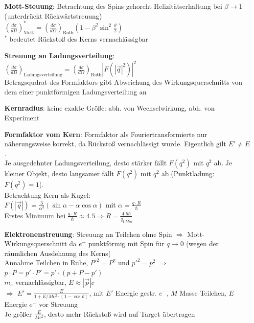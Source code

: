 \documentclass[10pt,twoside,a4paper]{article}
\begin{document}
\begin{multicols*}{3}
\textbf{Mott-Steuung}: Betrachtung des Spins gehorcht Helizitätserhaltung bei $\beta \to 1$ (unterdrückt Rückwärtstreuung) \\
$\left( \frac{d\sigma}{d\Omega} \right)^{*}_{\text{Mott}} = \left( \frac{d\sigma}{d\Omega} \right)_{\text{Ruth}} \left( 1 - \beta^2 \sin^2 \frac{\vartheta}{2} \right)$ \\
$^{*}$ bedeutet Rückstoß des Kerns vernachlässigbar

\textbf{Streuung an Ladungsverteilung}: \\
$\left( \frac{d\sigma}{d\Omega} \right)_{\text{Ladungsverteilung}} = \left( \frac{d\sigma}{d\Omega} \right)_{\text{Ruth}} \left| F\left( \left| \vec{q} \right|^2 \right) \right|^2$ \\
Betragsqudrat des Formfaktors gibt Abweichung des Wirkungsquerschnitts von dem einer punktförmigen Ladungsverteilung an

\textbf{Kernradius}: keine exakte Größe: abh. von Wechselwirkung, abh. von Experiment

\textbf{Formfaktor vom Kern}: Formfaktor als Fouriertransformierte nur näherungsweise korrekt, da Rückstoß vernachlässigt wurde. Eigentlich gilt $E' \neq E$. \\
Je ausgedehnter Ladungsverteilung, desto stärker fällt $F(q^2)$ mit $q^2$ ab. Je kleiner Objekt, desto langsamer fällt $F(q^2)$ mit $q^2$ ab (Punktladung: $F(q^2) = 1$). \\
Betrachtung Kern als Kugel: \\
$F\left( \left| \vec{q} \right| \right) = \frac{3}{\alpha^3} (\sin \alpha - \alpha \cos \alpha)$ mit $\alpha = \frac{q \cdot R}{\hbar}$ \\
Erstes Minimum bei $\frac{q \cdot R}{\hbar} \approx 4.5 \Rightarrow R = \frac{4.5 \hbar}{q_{1.Min}}$

\textbf{Elektronenstreuung}: Streuung an Teilchen ohne Spin $\Rightarrow$ Mott-Wirkungsquerschnitt da $e^-$ punktförmig mit Spin für $q \to 0$ (wegen der räumlichen Ausdehnung des Kerns) \\
Annahme Teilchen in Ruhe, $P'^2 = P^2$ und $p'^2 = p^2$ $\Rightarrow$ $p \cdot P = p' \cdot P' = p' \cdot (p + P - p')$ \\
$m_e$ vernachlässigbar, $E \approx \left| \vec{p} \right| c$ \\
$\Rightarrow$ $E' = \frac{E}{1 + E/Mc^2 \cdot (1 - \cos \vartheta)}$, mit $E'$ Energie gestr. $e^-$, $M$ Masse Teilchen, $E$ Energie $e^-$ vor Streuung \\
Je größer $\frac{E}{Mc^2}$, desto mehr Rückstoß wird auf Target übertragen


\end{multicols*}
\end{document}
